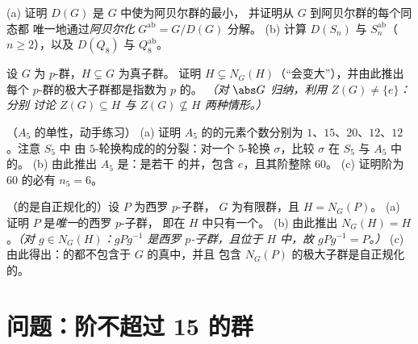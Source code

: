 \begin{exercise}[$\star\star$]\label{exo:b3:groups:9}
(a) 证明 $D(G)$ 是 $G$ 中使为阿贝尔群的最小，
并证明从 $G$ 到阿贝尔群的每个同态都
唯一地通过\emph{阿贝尔化}
$G^{\mathrm{ab}} = G/D(G)$ 分解。
(b) 计算 $D(S_n)$ 与 $S_n^{\mathrm{ab}}$（$n \geq 2$），以及
$D(Q_8)$ 与 $Q_8^{\mathrm{ab}}$。
\end{exercise}

\begin{exercise}[$\star\star$]\label{exo:b3:groups:10}
设 $G$ 为 $p$-群，$H \subsetneq G$ 为真子群。
证明 $H \subsetneq N_G(H)$（“会变大”），并由此推出
每个 $p$-群的极大子群都是指数为 $p$ 的。
\emph{（对 $\abs G$ 归纳，利用 $Z(G) \neq \{e\}$：分别
讨论 $Z(G) \subseteq H$ 与 $Z(G) \not\subseteq H$ 两种情形。）}
\end{exercise}

\begin{exercise}[$\star\star\star$]\label{exo:b3:groups:11}
（$A_5$ 的单性，动手练习）
(a) 证明 $A_5$ 的的元素个数分别为
$1$、$15$、$20$、$12$、$12$。注意 $S_5$ 中
由 $5$-轮换构成的的分裂：对一个 $5$-轮换 $\sigma$，比较
$\sigma$ 在 $S_5$ 与 $A_5$ 中的。
(b) 由此推出 $A_5$ 是：是若干
的并，包含 $e$，且其阶整除
$60$。
(c) 证明阶为 $60$ 的必有 $n_5 =
6$。
\end{exercise}

\begin{exercise}[$\star\star$]\label{exo:b3:groups:12}
（的是自正规化的）设 $P$ 为西罗 $p$-子群，
$G$ 为有限群，且 $H =
N_G(P)$。
(a) 证明 $P$ 是\emph{唯一}的西罗 $p$-子群，
即在 $H$ 中只有一个。
(b) 由此推出 $N_G(H) = H$。\emph{（对 $g \in N_G(H)$：$gPg^{-1}$
是西罗 $p$-子群，且位于 $H$ 中，故 $gPg^{-1} = P$。）}
(c) 由此得出：的都不包含于
$G$ 的真中，并且
包含 $N_G(P)$ 的极大子群是自正规化的。
\end{exercise}

\section{问题：阶不超过 15 的群}

